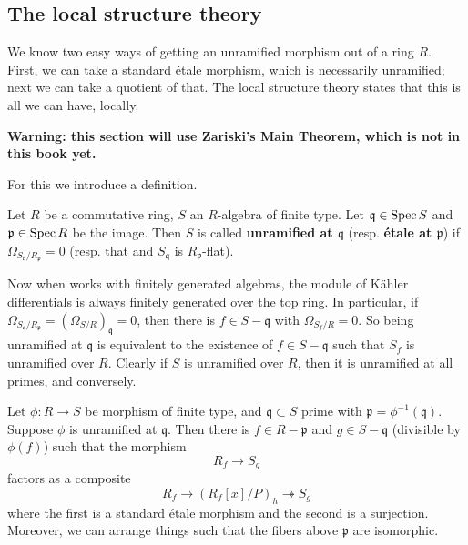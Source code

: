 \subsection{The local structure theory}
We know two easy ways of getting an unramified morphism out of a ring $R$.
First, we can take a standard \'etale morphism, which is necessarily
unramified; next we can take a quotient of that. The local structure theory
states that this is all we can have, locally.

\textbf{Warning: this section will use Zariski's Main Theorem, which is not in
this book yet.}


For this we introduce a definition.

\begin{definition} 
Let $R$ be a commutative ring, $S$ an $R$-algebra of finite type. Let $\mathfrak{q} \in \operatorname{Spec}
S$ and $\mathfrak{p} \in \operatorname{Spec} R$ be the image. Then $S$ is called
\textbf{unramified at $\mathfrak{q}$} (resp. \textbf{\'etale at
$\mathfrak{p}$}) if $\Omega_{S_{\mathfrak{q}}/R_{\mathfrak{p}}} = 0$ (resp.
that and $S_{\mathfrak{q}}$ is $R_{\mathfrak{p}}$-flat).
\end{definition} 

Now when works with finitely generated algebras, the module of K\"ahler
differentials is always finitely generated over the top ring. 
In particular, if 
$\Omega_{S_{\mathfrak{q}}/R_{\mathfrak{p}}} = (\Omega_{S/R} )_{\mathfrak{q}} =
0$, then there is $f \in S - \mathfrak{q}$ with $\Omega_{S_f/R} = 0$.
So being unramified at $\mathfrak{q}$ is equivalent to the existence of $f \in
S-\mathfrak{q}$ such that $S_f$ is unramified over $R$.
Clearly if $S$ is unramified over $R$, then it is unramified at all primes,
and conversely.


\begin{theorem} 
Let $\phi: R \to S$ be  morphism of finite type, and $\mathfrak{q} \subset S$ prime
with $\mathfrak{p} = \phi^{-1}(\mathfrak{q})$. Suppose $\phi$ is unramified at
$\mathfrak{q}$.
Then there is $f \in R- \mathfrak{p}$ and $g \in S - \mathfrak{q}$ (divisible
by $\phi(f)$) such that
the morphism
\[ R_f \to S_g  \]
factors as a composite
\[ R_f \to (R_f[x]/P)_{h} \twoheadrightarrow S_g  \]
where the first is a standard \'etale morphism and the second is a
surjection. Moreover, we can arrange things such that the fibers above
$\mathfrak{p}$ are isomorphic.
\end{theorem} 


